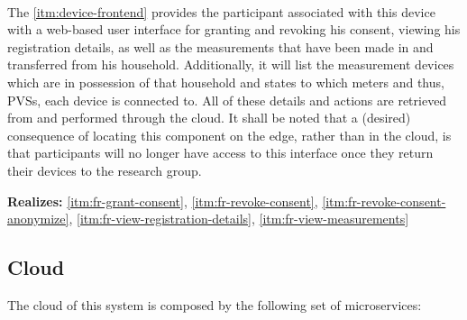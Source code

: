 \begin{description}[format={\storedescriptionlabel}]
  \item[Device Frontend\label{itm:device-frontend}]
  \hfill \\
  The \ref{itm:device-frontend} provides the participant associated with this device with a web-based user interface for granting and revoking his consent, viewing his registration details, as well as the measurements that have been made in and transferred from his household. Additionally, it will list the measurement devices which are in possession of that household and states to which meters and thus, \acsp{PVS}, each device is connected to. All of these details and actions are retrieved from and performed through the cloud. It shall be noted that a (desired) consequence of locating this component on the edge, rather than in the cloud, is that participants will no longer have access to this interface once they return their devices to the research group.

  \textbf{Realizes:} \ref{itm:fr-grant-consent}, \ref{itm:fr-revoke-consent}, \ref{itm:fr-revoke-consent-anonymize}, \ref{itm:fr-view-registration-details}, \ref{itm:fr-view-measurements}
\end{description}


\subsection{Cloud}
\label{sec:component-design-cloud}

The cloud of this system is composed by the following set of microservices:


